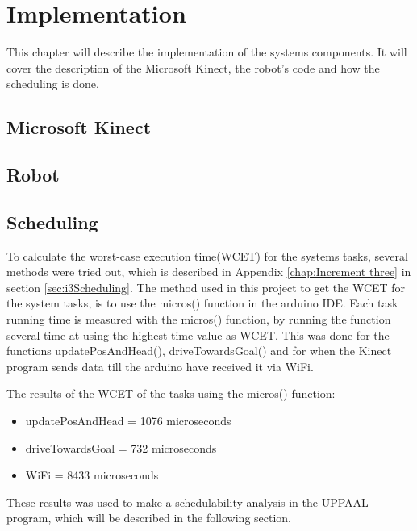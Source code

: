 \chapter{Implementation}
\label{chap:Implementation}
This chapter will describe the implementation of the systems components. It will cover the description of the Microsoft Kinect, the robot's code and how the scheduling is done. 

\section{Microsoft Kinect}
\label{sec:Microsoft Kinect Implementation}

\section{Robot}
\label{sec:Robot}

\section{Scheduling}
\label{sec:Scheduling implementation}
To calculate the worst-case execution time(WCET) for the systems tasks, several methods were tried out, which is described in Appendix \ref{chap:Increment three} in section \ref{sec:i3Scheduling}. 
The method used in this project to get the WCET for the system tasks, is to use the micros() function in the arduino IDE. \newline
Each task running time is measured with the micros() function, by running the function several time at using the highest time value as WCET. This was done for the functions updatePosAndHead(), driveTowardsGoal() and for when the Kinect program sends data till the arduino have received it via WiFi.

The results of the WCET of the tasks using the micros() function:
\begin{itemize}
	\item updatePosAndHead = 1076 microseconds
	\item driveTowardsGoal = 732 microseconds
	\item WiFi = 8433 microseconds
\end{itemize}
These results was used to make a schedulability analysis in the UPPAAL program, which will be described in the following section.
